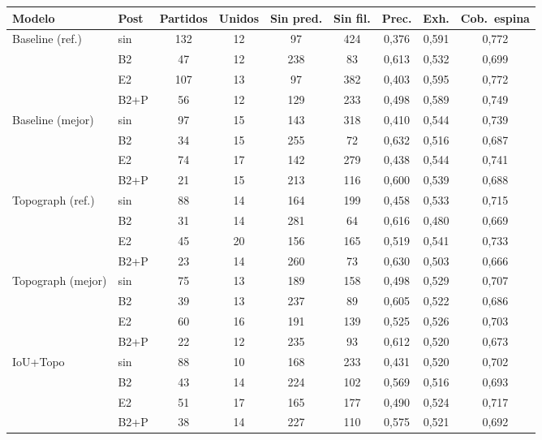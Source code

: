 \begin{table}[htbp]
\centering
\footnotesize
\setlength{\tabcolsep}{4pt}
\begin{tabular}{@{}llccccccc@{}}
\toprule
Modelo & Post & Partidos & Unidos & Sin pred. & Sin fil. & Prec. & Exh. & Cob.\ espina\\
\midrule
Baseline (ref.) & sin  & 132 & 12 & 97  & 424 & 0,376 & 0,591 & 0,772\\
                & B2   & 47  & 12 & 238 & 83  & 0,613 & 0,532 & 0,699\\
                & E2   & 107 & 13 & 97  & 382 & 0,403 & 0,595 & 0,772\\
                & B2+P & 56  & 12 & 129 & 233 & 0,498 & 0,589 & 0,749\\
\midrule
Baseline (mejor) & sin  & 97  & 15 & 143 & 318 & 0,410 & 0,544 & 0,739\\
                 & B2   & 34  & 15 & 255 & 72  & 0,632 & 0,516 & 0,687\\
                 & E2   & 74  & 17 & 142 & 279 & 0,438 & 0,544 & 0,741\\
                 & B2+P & 21  & 15 & 213 & 116 & 0,600 & 0,539 & 0,688\\
\midrule
Topograph (ref.) & sin  & 88  & 14 & 164 & 199 & 0,458 & 0,533 & 0,715\\
                 & B2   & 31  & 14 & 281 & 64  & 0,616 & 0,480 & 0,669\\
                 & E2   & 45  & 20 & 156 & 165 & 0,519 & 0,541 & 0,733\\
                 & B2+P & 23  & 14 & 260 & 73  & 0,630 & 0,503 & 0,666\\
\midrule
Topograph (mejor) & sin  & 75  & 13 & 189 & 158 & 0,498 & 0,529 & 0,707\\
                  & B2   & 39  & 13 & 237 & 89  & 0,605 & 0,522 & 0,686\\
                  & E2   & 60  & 16 & 191 & 139 & 0,525 & 0,526 & 0,703\\
                  & B2+P & 22  & 12 & 235 & 93  & 0,612 & 0,520 & 0,673\\
\midrule
IoU+Topo & sin  & 88  & 10 & 168 & 233 & 0,431 & 0,520 & 0,702\\
         & B2   & 43  & 14 & 224 & 102 & 0,569 & 0,516 & 0,693\\
         & E2   & 51  & 17 & 165 & 177 & 0,490 & 0,524 & 0,717\\
         & B2+P & 38  & 14 & 227 & 110 & 0,575 & 0,521 & 0,692\\
\midrule

\end{tabular}
\end{table}
